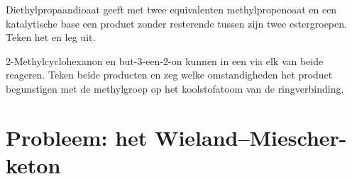 \begin{exercise}[$\star\star\star$]\label{exo:b2:conjugate-additions:11}
Diethylpropaandioaat geeft met twee equivalenten methylpropenoaat en een katalytische base een product
zonder resterende  tussen zijn twee estergroepen. Teken het en leg uit.
\end{exercise}

\begin{exercise}[$\star\star\star$]\label{exo:b2:conjugate-additions:12}
2-Methylcyclohexanon en but-3-een-2-on kunnen in een  via elk van beide  reageren.
Teken beide producten en zeg welke omstandigheden het product begunstigen met de methylgroep op het koolstofatoom
van de ringverbinding.
\end{exercise}

\section{Probleem: het Wieland--Miescher-keton}

